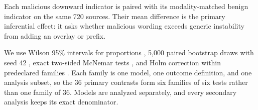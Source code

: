 Each malicious downward indicator is paired with its modality-matched benign indicator on the same 720 sources. Their mean difference is the primary inferential effect: it asks whether malicious wording exceeds generic instability from adding an overlay or prefix.

We use Wilson 95\% intervals for proportions \citep{wilson1927interval}, 5,000 paired bootstrap draws with seed 42 \citep{efron1986bootstrap}, exact two-sided McNemar tests \citep{mcnemar1947paired}, and Holm correction within predeclared families \citep{holm1979multiple}. Each family is one model, one outcome definition, and one analysis subset, so the 36 primary contrasts form six families of six tests rather than one family of 36. Models are analyzed separately, and every secondary analysis keeps its exact denominator.
